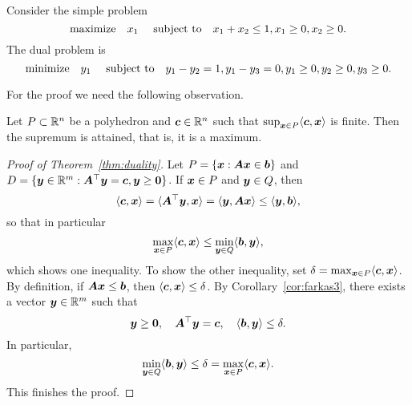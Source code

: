 \begin{example}
 Consider the simple problem
 \begin{equation*}
  \text{maximize}\quad x_1 \ \quad\text{subject to}\quad x_1+x_2\leq 1, x_1\geq 0, x_2\geq 0.
 \end{equation*}
The dual problem is
\begin{equation*}
 \text{minimize}\quad y_1 \ \quad\text{subject to}\quad y_1-y_2=1, y_1-y_3=0, y_1\geq 0, y_2\geq 0, y_3\geq 0. 
\end{equation*}
\end{example}

For the proof we need the following observation.

\begin{lemma}
 Let $P\subset \mathbb{R}^n$ be a polyhedron and $\bm{c}\in \mathbb{R}^n$ such that $\sup_{\bm{x}\in P}\langle {\bm{c}}, {\bm{x}} \rangle$ is finite. Then the supremum is attained, that is, it is a maximum.
\end{lemma}

\begin{proof}[Proof of Theorem~\ref{thm:duality}]
 Let $P=\{\bm{x}\mathrel{\mathop{:}} \bm{A}\bm{x}\in \bm{b}\}$ and $D=\{\bm{y}\in \mathbb{R}^m\mathrel{\mathop{:}} \bm{A}^{\top}\bm{y}=\bm{c}, \bm{y}\geq \bm{0}\}$. If $\bm{x}\in P$ and $\bm{y}\in Q$, then
 \begin{equation*}
  \langle {\bm{c}}, {\bm{x}} \rangle = \langle {\bm{A}^{\top}\bm{y}}, {\bm{x}} \rangle = \langle {\bm{y}}, {\bm{A}\bm{x}} \rangle\leq \langle {\bm{y}}, {\bm{b}} \rangle,
 \end{equation*}
so that in particular
\begin{equation*}
 \max_{\bm{x}\in P}\langle {\bm{c}}, {\bm{x}} \rangle\leq \min_{\bm{y}\in Q}\langle {\bm{b}}, {\bm{y}} \rangle,
\end{equation*}
which shows one inequality. To show the other inequality, set $\delta = \max_{\bm{x}\in P} \langle {\bm{c}}, {\bm{x}} \rangle$. By definition, if $\bm{A}\bm{x}\leq \bm{b}$, then $\langle {\bm{c}}, {\bm{x}} \rangle\leq \delta$. By Corollary~\ref{cor:farkas3}, there exists a vector $\bm{y}\in \mathbb{R}^m$ such that
\begin{equation*}
 \bm{y}\geq \bm{0}, \quad \bm{A}^{\top}\bm{y}=\bm{c}, \quad \langle {\bm{b}}, {\bm{y}} \rangle\leq \delta.
\end{equation*}
In particular,
\begin{equation*}
 \min_{\bm{y}\in Q} \langle {\bm{b}}, {\bm{y}} \rangle\leq \delta = \max_{\bm{x}\in P}\langle {\bm{c}}, {\bm{x}} \rangle.
\end{equation*}
This finishes the proof.

\end{proof}


